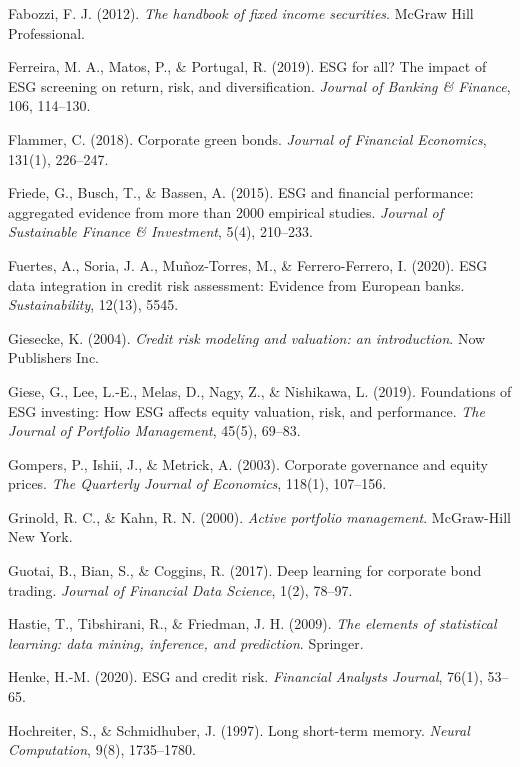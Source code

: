 \begin{thebibliography}{100}
Fabozzi, F. J. (2012). \textit{The handbook of fixed income securities}. McGraw Hill Professional.

Ferreira, M. A., Matos, P., \& Portugal, R. (2019). ESG for all? The impact of ESG screening on return, risk, and diversification. \textit{Journal of Banking \& Finance}, 106, 114--130.

Flammer, C. (2018). Corporate green bonds. \textit{Journal of Financial Economics}, 131(1), 226--247.

Friede, G., Busch, T., \& Bassen, A. (2015). ESG and financial performance: aggregated evidence from more than 2000 empirical studies. \textit{Journal of Sustainable Finance \& Investment}, 5(4), 210--233.

Fuertes, A., Soria, J. A., Muñoz-Torres, M., \& Ferrero-Ferrero, I. (2020). ESG data integration in credit risk assessment: Evidence from European banks. \textit{Sustainability}, 12(13), 5545.

Giesecke, K. (2004). \textit{Credit risk modeling and valuation: an introduction}. Now Publishers Inc.

Giese, G., Lee, L.-E., Melas, D., Nagy, Z., \& Nishikawa, L. (2019). Foundations of ESG investing: How ESG affects equity valuation, risk, and performance. \textit{The Journal of Portfolio Management}, 45(5), 69--83.

Gompers, P., Ishii, J., \& Metrick, A. (2003). Corporate governance and equity prices. \textit{The Quarterly Journal of Economics}, 118(1), 107--156.

Grinold, R. C., \& Kahn, R. N. (2000). \textit{Active portfolio management}. McGraw-Hill New York.

Guotai, B., Bian, S., \& Coggins, R. (2017). Deep learning for corporate bond trading. \textit{Journal of Financial Data Science}, 1(2), 78--97.

Hastie, T., Tibshirani, R., \& Friedman, J. H. (2009). \textit{The elements of statistical learning: data mining, inference, and prediction}. Springer.

Henke, H.-M. (2020). ESG and credit risk. \textit{Financial Analysts Journal}, 76(1), 53--65.

Hochreiter, S., \& Schmidhuber, J. (1997). Long short-term memory. \textit{Neural Computation}, 9(8), 1735--1780.


\end{thebibliography}
